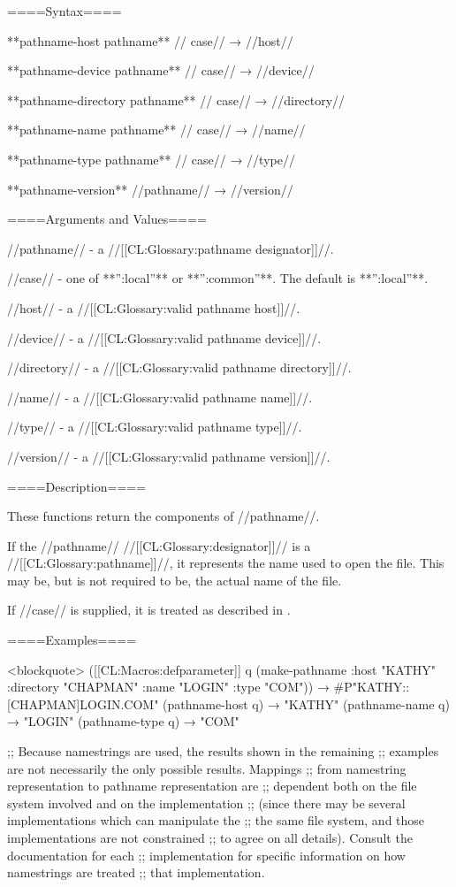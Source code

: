 
====Syntax====

**pathname-host {pathname** //\key} case// → //host//

**pathname-device {pathname** //\key} case// → //device//

**pathname-directory {pathname** //\key} case// → //directory//

**pathname-name {pathname** //\key} case// → //name//

**pathname-type {pathname** //\key} case// → //type//

**pathname-version** //pathname// → //version//

====Arguments and Values====

//pathname// - a //[[CL:Glossary:pathname designator]]//.

//case// - one of **'':local''** or **'':common''**. The default is **'':local''**.

//host// - a //[[CL:Glossary:valid pathname host]]//.

//device// - a //[[CL:Glossary:valid pathname device]]//.

//directory// - a //[[CL:Glossary:valid pathname directory]]//.

//name// - a //[[CL:Glossary:valid pathname name]]//.

//type// - a //[[CL:Glossary:valid pathname type]]//.

//version// - a //[[CL:Glossary:valid pathname version]]//.

====Description====

These functions return the components of //pathname//.

If the //pathname// //[[CL:Glossary:designator]]// is a //[[CL:Glossary:pathname]]//, it represents the name used to open the file. This may be, but is not required to be, the actual name of the file.

If //case// is supplied, it is treated as described in \secref\PathnameComponentCase.

====Examples====

<blockquote> ([[CL:Macros:defparameter]] q (make-pathname :host "KATHY" :directory "CHAPMAN" :name "LOGIN" :type "COM")) → #P"KATHY::[CHAPMAN]LOGIN.COM" (pathname-host q) → "KATHY" (pathname-name q) → "LOGIN" (pathname-type q) → "COM"

;; Because namestrings are used, the results shown in the remaining ;; examples are not necessarily the only possible results. Mappings ;; from namestring representation to pathname representation are ;; dependent both on the file system involved and on the implementation ;; (since there may be several implementations which can manipulate the ;; the same file system, and those implementations are not constrained ;; to agree on all details). Consult the documentation for each ;; implementation for specific information on how namestrings are treated ;; that implementation.

